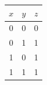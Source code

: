 \begin{tabular}{ccc}\toprule
\(x\)&\(y\)&\(z\)\\\midrule
0&0&0\\
0&1&1\\
1&0&1\\
1&1&1\\
\bottomrule\end{tabular}
